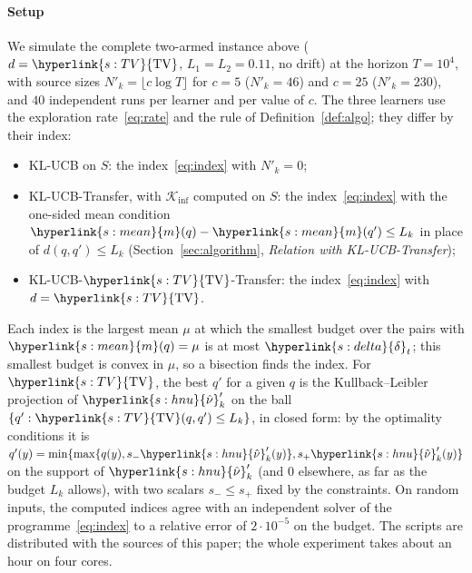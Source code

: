 \documentclass[11pt]{article}
\newcommand{\Kinf}{\mathcal{K}_{\inf}}
\newcommand{\sy}[2]{{\hyperlink{#1}{#2}}}
\newcommand{\mean}{\sy{s:mean}{m}}
\newcommand{\TV}{\sy{s:TV}{\mathrm{TV}}}
\newcommand{\hnu}{\sy{s:hnu}{\hat\nu}}
\newcommand{\dl}{\sy{s:delta}{\delta}}
\begin{document}
\paragraph{Setup} We simulate the complete two-armed instance above ($d=\TV$, $L_1=L_2=0.11$, no
drift) at the horizon $T=10^4$, with source sizes $N'_k=\lfloor c\log T\rfloor$ for $c=5$
($N'_k=46$) and $c=25$ ($N'_k=230$), and $40$ independent runs per learner and per value of $c$.
The three learners use the exploration rate~\eqref{eq:rate} and the rule of
Definition~\ref{def:algo}; they differ by their index:
\begin{itemize}
\item KL-UCB on $S$: the index~\eqref{eq:index} with $N'_k=0$;
\item KL-UCB-Transfer, with $\Kinf$ computed on $S$: the index~\eqref{eq:index} with the one-sided
  mean condition $\mean(q)-\mean(q')\le L_k$ in place of $d(q,q')\le L_k$
  (Section~\ref{sec:algorithm}, \emph{Relation with KL-UCB-Transfer});
\item KL-UCB-$\TV$-Transfer: the index~\eqref{eq:index} with $d=\TV$.
\end{itemize}
Each index is the largest mean $\mu$ at which the smallest budget over the pairs with $\mean(q)=\mu$
is at most $\dl_t$; this smallest budget is convex in $\mu$, so a bisection finds the index. For
$\TV$, the best $q'$ for a given $q$ is the Kullback--Leibler projection of $\hnu'_k$ on the ball
$\{q':\TV(q,q')\le L_k\}$, in closed form: by the optimality conditions it is
$q'(y)=\min\{\max\{q(y),s_-\hnu'_k(y)\},s_+\hnu'_k(y)\}$ on the support of $\hnu'_k$
(and $0$ elsewhere, as far as the budget $L_k$ allows), with two scalars $s_-\le s_+$ fixed by
the constraints. On random inputs, the computed indices
agree with an independent solver of the programme~\eqref{eq:index} to a relative error of
$2\cdot10^{-5}$ on the budget. The scripts are distributed with the sources of this paper; the whole
experiment takes about an hour on four cores.
\end{document}
